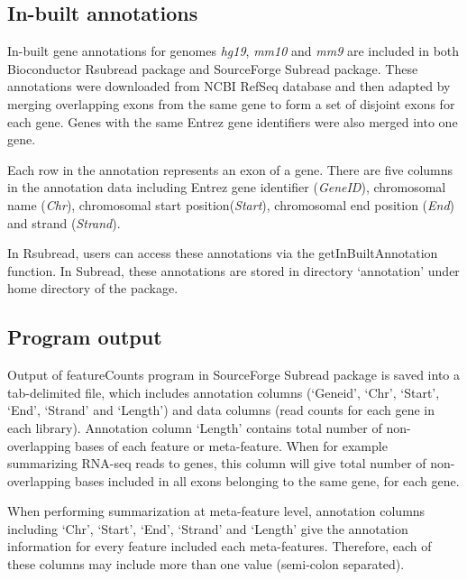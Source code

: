 \documentclass[12pt]{report}
\newcommand{\Subread}{\textsf{Subread}}
\newcommand{\Rsubread}{\textsf{Rsubread}}
\newcommand{\featureCounts}{\textsf{featureCounts}}
\begin{document}
\subsection{In-built annotations}

In-built gene annotations for genomes \emph{hg19}, \emph{mm10} and \emph{mm9} are included in both Bioconductor {\Rsubread} package and SourceForge {\Subread} package.
These annotations were downloaded from NCBI RefSeq database and then adapted by merging overlapping exons from the same gene to form a set of disjoint exons for each gene.
Genes with the same Entrez gene identifiers were also merged into one gene.

Each row in the annotation represents an exon of a gene. There are five columns in the annotation data including Entrez gene identifier (\emph{GeneID}), chromosomal name (\emph{Chr}), chromosomal start position(\emph{Start}), chromosomal end position (\emph{End}) and strand (\emph{Strand}).

In {\Rsubread}, users can access these annotations via the {\textsf{getInBuiltAnnotation}} function.
In {\Subread}, these annotations are stored in directory `annotation' under home directory of the package.

\subsection{Program output}

Output of {\featureCounts} program in SourceForge {\Subread} package is saved into a tab-delimited file, which includes annotation columns (`Geneid', `Chr', `Start', `End', `Strand' and `Length') and data columns (read counts for each gene in each library).
Annotation column `Length' contains total number of non-overlapping bases of each feature or meta-feature.
When for example summarizing RNA-seq reads to genes, this column will give total number of non-overlapping bases included in all exons belonging to the same gene, for each gene.

When performing summarization at meta-feature level, annotation columns including `Chr', `Start', `End', `Strand' and `Length' give the annotation information for every feature included each meta-features.
Therefore, each of these columns may include more than one value (semi-colon separated).
\end{document}
